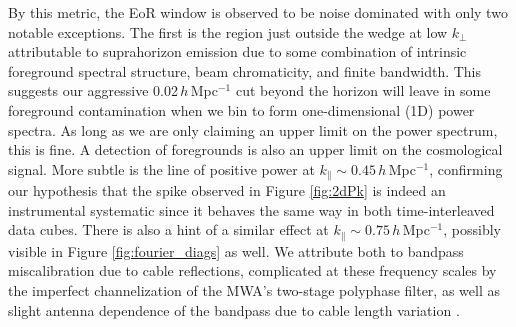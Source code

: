 By this metric, the EoR window is observed to be noise dominated with only two notable exceptions. The first is the region just outside the wedge at low $k_\perp$ attributable to suprahorizon emission due to some combination of  intrinsic foreground spectral structure, beam chromaticity, and finite bandwidth. This suggests our aggressive 0.02\,$h$\,Mpc$^{-1}$ cut beyond the horizon will leave in some foreground contamination when we bin to form one-dimensional (1D) power spectra. As long as we are only claiming an upper limit on the power spectrum, this is fine. A detection of foregrounds is also an upper limit on the cosmological signal. More subtle is the line of positive power at $k_\| \sim 0.45$\,$h$\,Mpc$^{-1}$, confirming our hypothesis that the spike observed in Figure \ref{fig:2dPk} is indeed an instrumental systematic since it behaves the same way in both time-interleaved data cubes. There is also a hint of a similar effect at $k_\| \sim 0.75$\,$h$\,Mpc$^{-1}$, possibly visible in Figure \ref{fig:fourier_diags} as well. We attribute both to bandpass miscalibration due to cable reflections, complicated at these frequency scales by the imperfect channelization of the MWA's two-stage polyphase filter, as well as slight antenna dependence of the bandpass due to cable length variation \cite{HazeltonEppsilon}.

